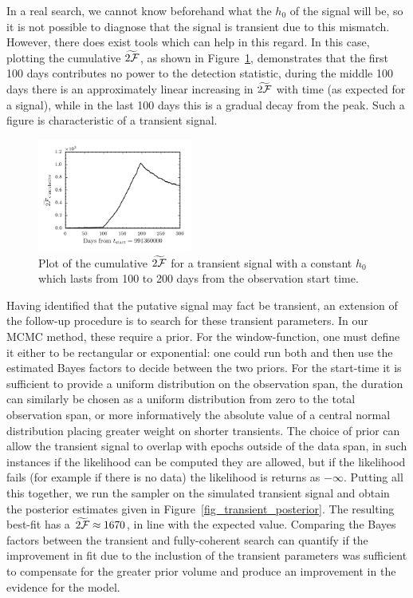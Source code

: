 \documentclass[aps, prd, twocolumn, superscriptaddress, floatfix, showpacs, nofootinbib, longbibliography]{revtex4-1}
\begin{document}
In a real search, we cannot know beforehand what the $h_0$ of the signal will
be, so it is not possible to diagnose that the signal is transient due to this
mismatch. However, there does exist tools which can help in this regard. In
this case, plotting the cumulative $\widetilde{2{\mathcal{F}}}$, as shown in
Figure~\ref{fig_transient_cumulative_twoF}, demonstrates that the first 100
days contributes no power to the detection statistic, during the middle 100
days there is an approximately linear increasing in $\widetilde{2{\mathcal{F}}}$ with time
(as expected for a signal), while in the last 100 days this is a gradual decay
from the peak. Such a figure is characteristic of a transient signal.
\begin{figure}[htb]
\centering
\includegraphics[width=0.45\textwidth]{transient_search_initial_stage_twoFcumulative}
\caption{Plot of the cumulative $\widetilde{2{\mathcal{F}}}$ for a transient signal with a
constant $h_0$ which lasts from 100 to 200 days from the observation start
time.}
\label{fig_transient_cumulative_twoF}
\end{figure}

Having identified that the putative signal may fact be transient, an extension
of the follow-up procedure is to search for these transient parameters. In our
MCMC method, these require a prior. For the window-function, one must define it
either to be rectangular or exponential: one could run both and then use the
estimated Bayes factors to decide between the two priors. For the start-time it
is sufficient to provide a uniform distribution on the observation span, the
duration can similarly be chosen as a uniform distribution from zero to the
total observation span, or more informatively the absolute value of a central
normal distribution placing greater weight on shorter transients. The choice of
prior can allow the transient signal to overlap with epochs outside of the data
span, in such instances if the likelihood can be computed they are allowed, but
if the likelihood fails (for example if there is no data) the likelihood is
returns as $-\infty$. Putting all this together, we run the sampler on the
simulated transient signal and obtain the posterior estimates given in
Figure~\ref{fig_transient_posterior}. The resulting best-fit has a
$\widetilde{2{\mathcal{F}}}\approx 1670$, in line with the expected value. Comparing the
Bayes factors between the transient and fully-coherent search can quantify if
the improvement in fit due to the inclustion of the transient parameters was
sufficient to compensate for the greater prior volume and produce an
improvement in the evidence for the model.
\end{document}
